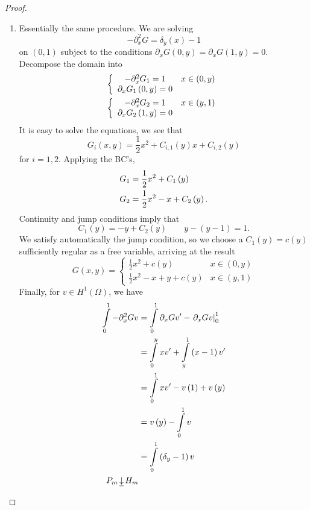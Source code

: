 \documentclass[letterpaper,twoside,11pt]{article}
\theoremstyle{mystyle}
\newcommand{\cbk}{\color{black}}
\newcommand{\Hone}{H^1\left( \Omega \right)}
\begin{document}
\begin{proof}
\begin{enumerate}
    \item Essentially the same procedure. We are solving 
    \[ - \partial _x^2G = {\delta _y}\left( x \right) - 1\]
    on $(0,1)$ subject to the conditions ${\partial _x}G\left( {0,y} \right) = {\partial _x}G\left( {1,y} \right) = 0$. Decompose the domain into 
    \[\begin{gathered}
      \left\{ {\begin{array}{*{20}{c}}
      { - \partial _x^2{G_1} = 1}&{x \in \left( {0,y} \right)} \\ 
      {{\partial _x}{G_1}\left( {0,y} \right) = 0}&{} 
    \end{array}} \right. \hfill \\
      \left\{ {\begin{array}{*{20}{c}}
      { - \partial _x^2{G_2} = 1}&{x \in \left( {y,1} \right)} \\ 
      {{\partial _x}{G_2}\left( {1,y} \right) = 0}&{} 
    \end{array}} \right. \hfill \\ 
    \end{gathered} \]
    It is easy to solve the equations, we see that 
    \[{G_i}\left( {x,y} \right) = \frac{1}{2}{x^2} + {C_{i,1}}\left( y \right)x + {C_{i,2}}\left( y \right)\] 
    for $i = 1, 2$. Applying the BC's, 
    \[\begin{gathered}
      {G_1} = \frac{1}{2}{x^2} + {C_1}\left( y \right) \hfill \\
      {G_2} = \frac{1}{2}{x^2} - x + {C_2}\left( y \right).
    \end{gathered} \]
    Continuity and jump conditions imply that 
    \[{C_1}\left( y \right) =  - y + {C_2}\left( y \right)\qquad y - \left( {y - 1} \right) = 1.\]
    We satisfy automatically the jump condition, so we choose a $C_1(y) = c(y)$ sufficiently regular as a free variable, arriving at the result 
    \[G\left( {x,y} \right) = \left\{ {\begin{array}{*{20}{l}}
      {\frac{1}{2}{x^2} + c(y)}&{x \in \left( {0,y} \right)} \\[.2cm] 
      {\frac{1}{2}{x^2} - x + y + c\left( y \right)}&{x \in \left( {y,1} \right)} 
    \end{array}} \right.\]
    Finally, for $v\in \Hone$, we have 
    \begin{align*}
        \int\limits_0^1 { - \partial _x^2Gv}  &= \int\limits_0^1 {{\partial _x}Gv'}  - \left. {{\partial _x}Gv} \right|_0^1 \hfill \\
         &= \int\limits_0^y {xv'}  + \int\limits_y^1 {\left( {x - 1} \right)v'}  \hfill \\
         &= \int\limits_0^1 {xv'}  - v\left( 1 \right) + v\left( y \right) \hfill \\
         &= v\left( y \right) - \int\limits_0^1 v  \hfill \\
         &= \int\limits_0^1 {\left( {{\delta _y} - 1} \right)v} \\
         P_m \, \underline{\downarrow}\, H_m
    \end{align*}
  \end{enumerate}
\end{proof}
\cbk 
\end{document}
